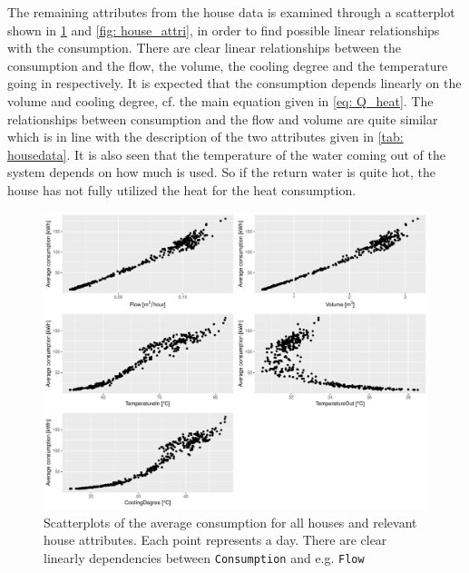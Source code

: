 \noindent The remaining attributes from the house data is examined through a scatterplot shown in \cref{fig: housepairs} and \cref{fig: house_attri}, in order to find possible linear relationships with the consumption. There are clear linear relationships between the consumption and the flow, the volume, the cooling degree and the temperature going in respectively. It is expected that the consumption depends linearly on the volume and cooling degree, cf. the main equation given in \cref{eq: Q_heat}. The relationships between consumption and the flow and volume are quite similar which is in line with the description of the two attributes given in \cref{tab: housedata}. It is also seen that the temperature of the water coming out of the system depends on how much is used. So if the return water is quite hot, 
the house has not fully utilized the heat for the heat consumption. 
\begin{figure}
    \centering
    \includegraphics[width=1.\textwidth]{../../../figures/housepairs.pdf}
    \caption{Scatterplots of the average consumption for all houses and relevant house attributes. Each point represents a day. There are clear linearly dependencies between \texttt{Consumption} and e.g. \texttt{Flow}} 
    \label{fig: housepairs}
\end{figure}


